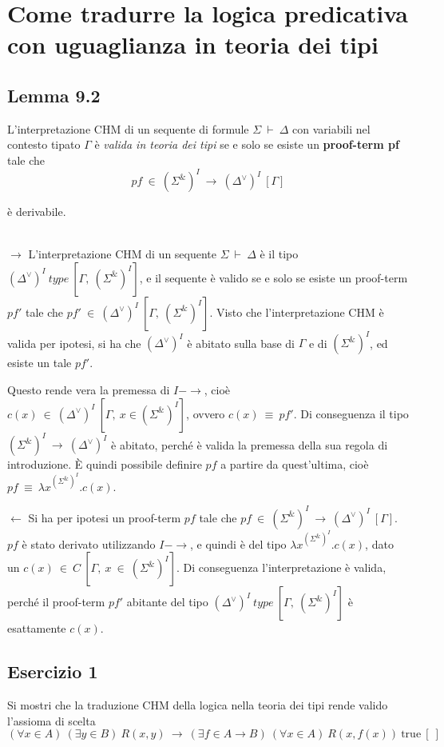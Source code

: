 \newpage
\section{Come tradurre la logica predicativa con uguaglianza in teoria dei tipi}
\subsection{Lemma 9.2}
\begin{lem}
	L'interpretazione CHM di un sequente di formule $\Sigma~\vdash~\Delta$ con variabili nel contesto tipato $\Gamma$ è \textit{valida in teoria dei tipi} se e solo se esiste un \textbf{proof-term pf} tale che 
	\[pf~\in~(\Sigma^{\&})^I~\to~(\Delta^{\vee})^I~[\Gamma]\]
	
	è derivabile.
\end{lem}

\proof \mbox{} \\

$\to$ L'interpretazione CHM di un sequente $\Sigma~\vdash~\Delta$ è il tipo $(\Delta^{\vee})^I~type~[\Gamma,~(\Sigma^{\&})^I]$, e il sequente è valido se e solo se esiste un proof-term $pf'$ tale che 
$pf'~\in~(\Delta^{\vee})^I~[\Gamma,~(\Sigma^{\&})^I]$. Visto che l'interpretazione CHM è valida per ipotesi, si ha che $(\Delta^{\vee})^I$ è abitato sulla base di $\Gamma$ e di $(\Sigma^{\&})^I$, ed esiste un tale $pf'$.

Questo rende vera la premessa di $I-\to$, cioè $c(x)~\in~(\Delta^{\vee})^I~[\Gamma,~x\in(\Sigma^{\&})^I]$, ovvero $c(x)~\equiv~pf'$. Di conseguenza il tipo $(\Sigma^{\&})^I~\to~(\Delta^{\vee})^I$ è abitato, perché è valida la premessa della sua regola di introduzione. È quindi possibile definire $pf$ a partire da quest'ultima, cioè $pf~\equiv~\lambda x^{(\Sigma^{\&})^I}.c(x)$.

\vspace{0.2in}
$\leftarrow$ Si ha per ipotesi un proof-term $pf$ tale che $pf~\in~(\Sigma^{\&})^I~\to~(\Delta^{\vee})^I~[\Gamma]$. $pf$ è stato derivato utilizzando $I-\to$, e quindi è del tipo $\lambda x^{(\Sigma^{\&})^I}.c(x)$, dato un $c(x)~\in~C~[\Gamma,~x~\in~(\Sigma^{\&})^I]$. Di conseguenza l'interpretazione è valida, perché il proof-term $pf'$ abitante del tipo 
$(\Delta^{\vee})^I~type~[\Gamma,~(\Sigma^{\&})^I]$ è esattamente $c(x)$.

\endproof

\subsection{Esercizio 1}
\begin{thm} Si mostri che la traduzione CHM della logica nella teoria dei tipi rende valido l'assioma di scelta
	\[ (\forall x\in A)\ (\exists y\in B)\  R(x, y)\ \to\ (\exists f\in A\to B)\ (\forall x\in A)\ R(x, f(x))\ \mathrm{true}\ [\ ] \]
	
\end{thm}

